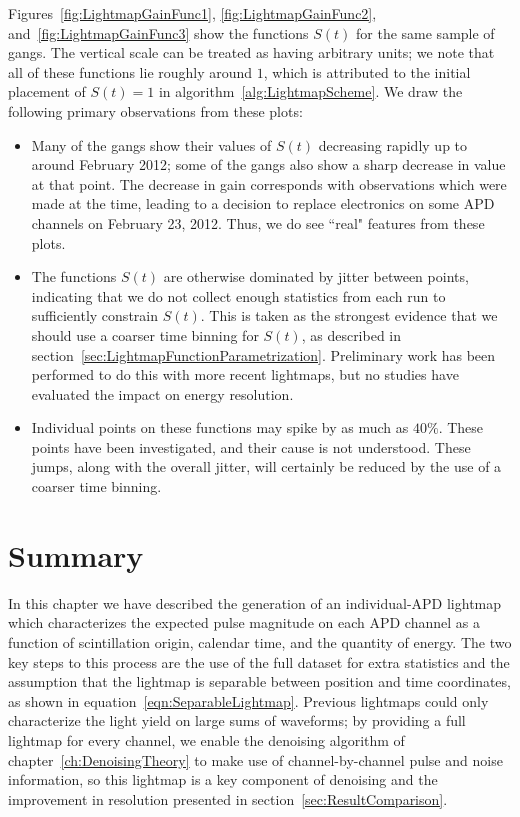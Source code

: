 Figures~\ref{fig:LightmapGainFunc1}, \ref{fig:LightmapGainFunc2}, and~\ref{fig:LightmapGainFunc3} show the functions $S(t)$ for the same sample of gangs.  The vertical scale can be treated as having arbitrary units; we note that all of these functions lie roughly around $1$, which is attributed to the initial placement of $S(t) = 1$ in algorithm~\ref{alg:LightmapScheme}.  We draw the following primary observations from these plots:
\begin{itemize}
\item Many of the gangs show their values of $S(t)$ decreasing rapidly up to around February 2012; some of the gangs also show a sharp decrease in value at that point.  The decrease in gain corresponds with observations which were made at the time, leading to a decision to replace electronics on some APD channels on February 23, 2012.  Thus, we do see ``real" features from these plots.
\item The functions $S(t)$ are otherwise dominated by jitter between points, indicating that we do not collect enough statistics from each run to sufficiently constrain $S(t)$.  This is taken as the strongest evidence that we should use a coarser time binning for $S(t)$, as described in section~\ref{sec:LightmapFunctionParametrization}.  Preliminary work has been performed to do this with more recent lightmaps, but no studies have evaluated the impact on energy resolution.
\item Individual points on these functions may spike by as much as $40\%$.  These points have been investigated, and their cause is not understood.  These jumps, along with the overall jitter, will certainly be reduced by the use of a coarser time binning.
\end{itemize}

\section{Summary}

In this chapter we have described the generation of an individual-APD lightmap which characterizes the expected pulse magnitude on each APD channel as a function of scintillation origin, calendar time, and the quantity of energy.  The two key steps to this process are the use of the full dataset for extra statistics and the assumption that the lightmap is separable between position and time coordinates, as shown in equation~\ref{eqn:SeparableLightmap}.  Previous lightmaps could only characterize the light yield on large sums of waveforms; by providing a full lightmap for every channel, we enable the denoising algorithm of chapter~\ref{ch:DenoisingTheory} to make use of channel-by-channel pulse and noise information, so this lightmap is a key component of denoising and the improvement in resolution presented in section~\ref{sec:ResultComparison}.
